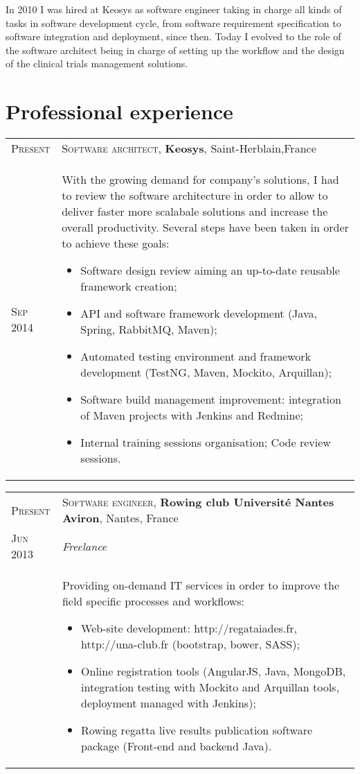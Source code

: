 \documentclass[letter,10pt]{article} %
\begin{document}
In 2010 I was hired at Keosys as software engineer taking in charge all kinds of
tasks in software development cycle, from software requirement
specification to software integration and deployment, since then. Today I
evolved to the role of the software architect being in charge of setting up the workflow and the design of the clinical trials management solutions. 

\section{Professional experience}

\begin{tabular}{R{2cm}|p{15.5cm}}
\textsc{Present} & \textsc{Software architect}, \normalsize\textbf{Keosys},
Saint-Herblain,France \\
\textsc{Sep 2014} & \vspace{-1mm} With the growing demand for company's
solutions, I had to review  the software architecture in
order to allow to deliver faster more scalabale solutions and increase the
overall productivity. Several steps have been taken in order to achieve these
goals:
\begin{itemize} 
  \item Software design review aiming an up-to-date reusable framework creation; 
  \item API and software framework development (Java, Spring, RabbitMQ, Maven);  
  \item Automated testing environment and framework development (TestNG,
  Maven, Mockito, Arquillan);
  \item Software build management improvement: integration of Maven projects
  with Jenkins and Redmine;
  \item Internal training sessions organisation; Code review sessions.
\end{itemize} 

\end{tabular}

\begin{tabular}{R{2cm}|p{15.5cm}}

\textsc{Present} & \textsc{Software engineer}, \normalsize\textbf{Rowing club
Universit\'{e} Nantes Aviron}, Nantes, France \\
\textsc{Jun 2013} & \emph{Freelance} \\
& \vspace{-1mm}  Providing on-demand IT services in order to improve the
field specific processes and workflows:
\begin{itemize} 
\item Web-site development: http://regataiades.fr, http://una-club.fr
(bootstrap, bower, SASS);
\item Online registration tools (AngularJS, Java, MongoDB, integration testing
with Mockito and Arquillan tools, deployment managed with Jenkins);
\item Rowing regatta live results publication software package (Front-end and
backend Java).
\end{itemize}
 
\end{tabular}
\end{document}

